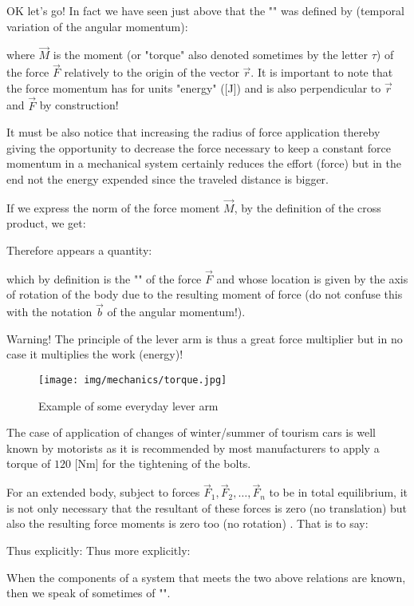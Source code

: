 	 OK let's go! In fact we have seen just above that the "" was defined by (temporal variation of the angular momentum):
	
	where $\vec{M}$ is the moment (or "torque" also denoted sometimes by the letter $\tau$) of the force $\vec{F}$ relatively to the origin of the vector $\vec{r}$. It is important to note that the force momentum has for units "energy" ([J]) and is also perpendicular to $\vec{r}$ and $\vec{F}$ by construction!
	
	It must be also notice that increasing the radius of force application thereby giving the opportunity to decrease the force necessary to keep a constant force momentum in a mechanical system certainly reduces the effort (force) but in the end not the energy expended since the traveled distance is bigger.
	
	If we express the norm of the force moment $\vec{M}$, by the definition of the cross product, we get:
	
	Therefore appears a quantity:
	
	which by definition is the "" of the force $\vec{F}$ and whose location is given by the axis of rotation of the body due to the resulting moment of force (do not confuse this with the notation $\vec{b}$ of the angular momentum!).
	
	Warning! The principle of the lever arm is thus a great force multiplier but in no case it multiplies the work (energy)!
	\begin{figure}[H]
		\centering
		\texttt{[image: img/mechanics/torque.jpg]}
		\caption{Example of some everyday lever arm}
	\end{figure}
	\begin{tcolorbox}[title=Remark,colframe=black,arc=10pt]
	The case of application of changes of winter/summer of tourism cars is well known by motorists as it is recommended by most manufacturers to apply a torque of $120$ [Nm] for the tightening of the bolts.
	\end{tcolorbox}
	For an extended body, subject to forces $\vec{F}_1,\vec{F}_2,\ldots,\vec{F}_n$ to be in total equilibrium, it is not only necessary that the resultant of these forces is zero (no translation) but also the resulting force moments is zero too (no rotation) . That is to say:
	
	Thus explicitly:
	Thus more explicitly:
	
	When the components of a system that meets the two above relations are known, then we speak of sometimes of "".
	
